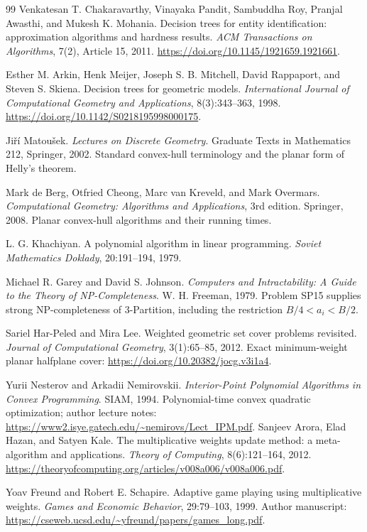 \begin{thebibliography}{99}
Venkatesan T. Chakaravarthy, Vinayaka Pandit, Sambuddha Roy,
Pranjal Awasthi, and Mukesh K. Mohania.
\newblock Decision trees for entity identification: approximation
algorithms and hardness results.
\newblock \emph{ACM Transactions on Algorithms}, 7(2), Article 15,
2011.
\newblock \url{https://doi.org/10.1145/1921659.1921661}.

Esther M. Arkin, Henk Meijer, Joseph S. B. Mitchell, David Rappaport,
and Steven S. Skiena.
\newblock Decision trees for geometric models.
\newblock \emph{International Journal of Computational Geometry and
Applications}, 8(3):343--363, 1998.
\newblock \url{https://doi.org/10.1142/S0218195998000175}.

Ji\v{r}\'i Matou\v{s}ek.
\newblock \emph{Lectures on Discrete Geometry}.
\newblock Graduate Texts in Mathematics 212, Springer, 2002.
\newblock Standard convex-hull terminology and the planar form
of Helly's theorem.

Mark de Berg, Otfried Cheong, Marc van Kreveld, and Mark Overmars.
\newblock \emph{Computational Geometry: Algorithms and Applications},
3rd edition.
\newblock Springer, 2008.
\newblock Planar convex-hull algorithms and their running times.

L. G. Khachiyan.
\newblock A polynomial algorithm in linear programming.
\newblock \emph{Soviet Mathematics Doklady}, 20:191--194, 1979.

Michael R. Garey and David S. Johnson.
\newblock \emph{Computers and Intractability:
A Guide to the Theory of NP-Completeness}.
\newblock W. H. Freeman, 1979.
\newblock Problem SP15 supplies strong NP-completeness of 3-Partition,
including the restriction $B/4<a_i<B/2$.

Sariel Har-Peled and Mira Lee.
\newblock Weighted geometric set cover problems revisited.
\newblock \emph{Journal of Computational Geometry}, 3(1):65--85, 2012.
\newblock Exact minimum-weight planar halfplane cover:
\url{https://doi.org/10.20382/jocg.v3i1a4}.

Yurii Nesterov and Arkadii Nemirovskii.
\newblock \emph{Interior-Point Polynomial Algorithms in Convex Programming}.
\newblock SIAM, 1994.
\newblock Polynomial-time convex quadratic optimization; author lecture notes:
\url{https://www2.isye.gatech.edu/~nemirovs/Lect_IPM.pdf}.
Sanjeev Arora, Elad Hazan, and Satyen Kale.
\newblock The multiplicative weights update method: a meta-algorithm
and applications.
\newblock \emph{Theory of Computing}, 8(6):121--164, 2012.
\newblock \url{https://theoryofcomputing.org/articles/v008a006/v008a006.pdf}.

Yoav Freund and Robert E. Schapire.
\newblock Adaptive game playing using multiplicative weights.
\newblock \emph{Games and Economic Behavior}, 29:79--103, 1999.
\newblock Author manuscript:
\url{https://cseweb.ucsd.edu/~yfreund/papers/games_long.pdf}.
\end{thebibliography}
\endgroup
